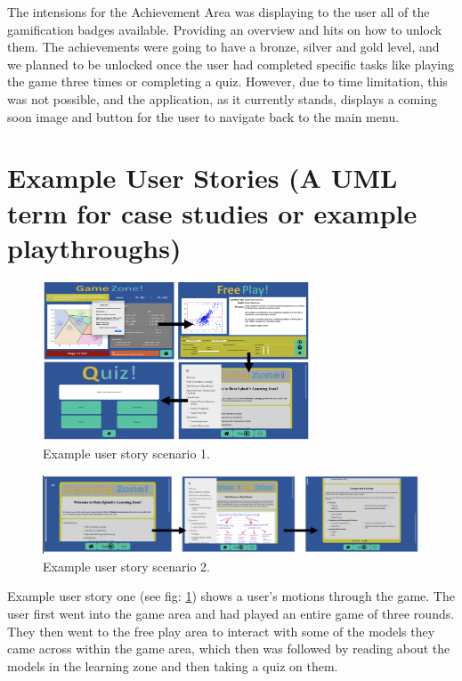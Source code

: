 	The intensions for the Achievement Area was displaying to the user all of the gamification badges available. Providing an overview and hits on how to unlock them. The achievements were going to have a bronze, silver and gold level, and we planned to be unlocked once the user had completed specific tasks like playing the game three times or completing a quiz. However, due to time limitation, this was not possible, and the application, as it currently stands, displays a coming soon image and button for the user to navigate back to the main menu.
	
	
	\section{Example User Stories (A UML term for case studies or example playthroughs)}
	\label{sec:user_stories}
	
		\begin{figure}[t]
			\begin{center}
				\includegraphics[width=8cm]{graphics/player_example_1.png}
				\caption{Example user story scenario 1.}
				\label{fig:user_story_1}
			\end{center}
		\end{figure}
	
	\begin{figure}[b]
		\begin{center}
			\includegraphics[width=13cm]{graphics/lz_us_example.png}
			\caption{Example user story scenario 2.}
			\label{fig:user_story_2}
		\end{center}
	\end{figure}
	
	
	Example user story one (see fig: \ref{fig:user_story_1}) shows a user's motions through the game. The user first went into the game area and had played an entire game of three rounds. They then went to the free play area to interact with some of the models they came across within the game area, which then was followed by reading about the models in the learning zone and then taking a quiz on them.
	
